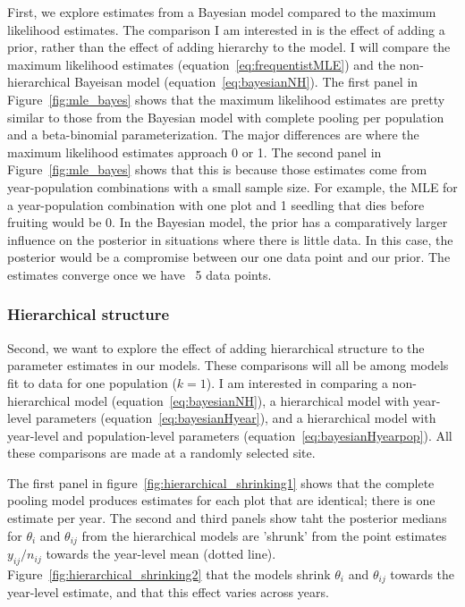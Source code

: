 \documentclass[12pt, oneside, titlepage]{article}   	%
\begin{document}
First, we explore estimates from a Bayesian model compared to the maximum likelihood estimates. The comparison I am interested in is the effect of adding a prior, rather than the effect of adding hierarchy to the model. I will compare the maximum likelihood estimates (equation~\eqref{eq:frequentistMLE}) and the non-hierarchical Bayeisan model (equation~\eqref{eq:bayesianNH}). The first panel in Figure~\ref{fig:mle_bayes} shows that the maximum likelihood estimates are pretty similar to those from the Bayesian model with complete pooling per population and a beta-binomial parameterization. The major differences are where the maximum likelihood estimates approach 0 or 1. The second panel in Figure~\ref{fig:mle_bayes} shows that this is because those estimates come from year-population combinations with a small sample size. For example, the MLE for a year-population combination with one plot and 1 seedling that dies before fruiting would be 0. In the Bayesian model, the prior has a comparatively larger influence on the posterior in situations where there is little data. In this case, the posterior would be a compromise between our one data point and our prior. The estimates converge once we have ~5 data points.

\subsubsection*{Hierarchical structure}

Second, we want to explore the effect of adding hierarchical structure to the parameter estimates in our models. These comparisons will all be among models fit to data for one population ($k=1$). I am interested in comparing a non-hierarchical model (equation~\eqref{eq:bayesianNH}), a hierarchical model with year-level parameters (equation~\eqref{eq:bayesianHyear}), and a hierarchical model with year-level and population-level parameters (equation~\eqref{eq:bayesianHyearpop}). All these comparisons are made at a randomly selected site. 

The first panel in figure~\ref{fig:hierarchical_shrinking1} shows that the complete pooling model produces estimates for each plot that are identical; there is one estimate per year. The second and third panels show taht the posterior medians for $\theta_i$ and $\theta_{ij}$ from the hierarchical models are 'shrunk' from the point estimates $y_{ij}/n_{ij}$ towards the year-level mean (dotted line). Figure~\ref{fig:hierarchical_shrinking2} that the models shrink $\theta_i$ and $\theta_{ij}$ towards the year-level estimate, and that this effect varies across years. 
\end{document}
